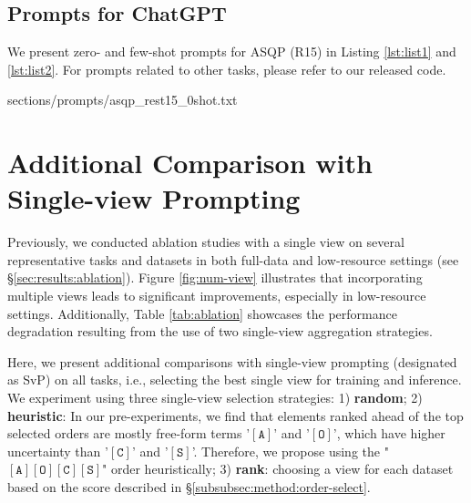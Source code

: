 \documentclass[11pt]{article}
\begin{document}
\subsection{Prompts for ChatGPT}
We present zero- and few-shot prompts for ASQP (R15) in Listing \ref{lst:list1} and \ref{lst:list2}. For prompts related to other tasks, please refer to our released code.

\begin{figure*}
    \centering
    
    {sections/prompts/asqp_rest15_0shot.txt}
\end{figure*}


\begin{figure*}
    \centering
    
\end{figure*}


\section{Additional Comparison with Single-view Prompting}
\label{sec:appendix:svp}

Previously, we conducted ablation studies with a single view on several representative tasks and datasets in both full-data and low-resource settings (see \S \ref{sec:results:ablation}). Figure \ref{fig:num-view} illustrates that incorporating multiple views leads to significant improvements, especially in low-resource settings. Additionally, Table \ref{tab:ablation} showcases the performance degradation resulting from the use of two single-view aggregation strategies.

Here, we present additional comparisons with single-view prompting (designated as SvP) on all tasks, i.e., selecting the best single view for training and inference. We experiment using three single-view selection strategies:
1) \textbf{random};
2) \textbf{heuristic}: In our pre-experiments, we find that elements ranked ahead of the top selected orders are mostly free-form terms '$[\mathtt{A}]$' and '$[\mathtt{O}]$', which have higher uncertainty than '$[\mathtt{C}]$' and '$[\mathtt{S}]$'. Therefore, we propose using the "$[\mathtt{A}][\mathtt{O}][\mathtt{C}][\mathtt{S}]$" order heuristically;
3) \textbf{rank}: choosing a view for each dataset based on the score described in \S \ref{subsubsec:method:order-select}.
\end{document}
